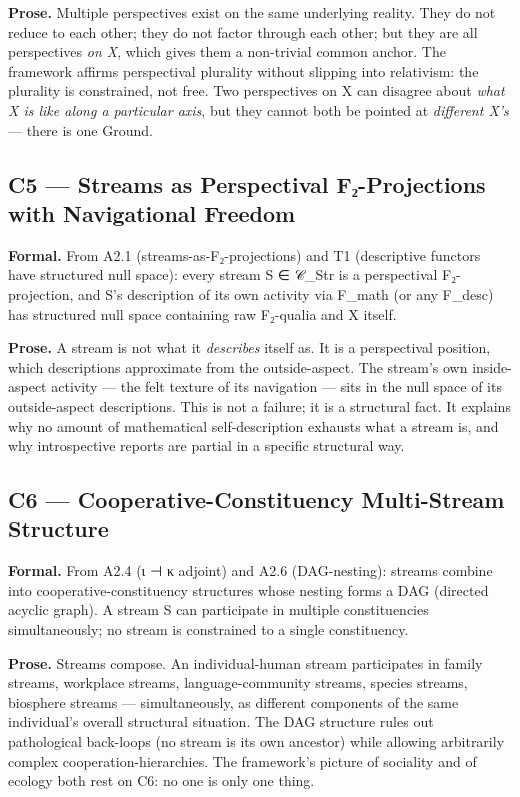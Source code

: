 \documentclass[11pt, openany]{book}
\begin{document}
\textbf{Prose.} Multiple perspectives exist on the same underlying reality. They do not reduce to each other; they do not factor through each other; but they are all perspectives \textit{on X}, which gives them a non-trivial common anchor. The framework affirms perspectival plurality without slipping into relativism: the plurality is constrained, not free. Two perspectives on X can disagree about \textit{what X is like along a particular axis}, but they cannot both be pointed at \textit{different X's} --- there is one Ground.

\subsection{C5 --- Streams as Perspectival F₂-Projections with Navigational Freedom}

\textbf{Formal.} From A2.1 (streams-as-F₂-projections) and T1 (descriptive functors have structured null space): every stream S ∈ 𝒞\_\allowbreak{}Str is a perspectival F₂-projection, and S's description of its own activity via F\_\allowbreak{}math (or any F\_\allowbreak{}desc) has structured null space containing raw F₂-qualia and X itself.

\textbf{Prose.} A stream is not what it \textit{describes} itself as. It is a perspectival position, which descriptions approximate from the outside-aspect. The stream's own inside-aspect activity --- the felt texture of its navigation --- sits in the null space of its outside-aspect descriptions. This is not a failure; it is a structural fact. It explains why no amount of mathematical self-description exhausts what a stream is, and why introspective reports are partial in a specific structural way.

\subsection{C6 --- Cooperative-Constituency Multi-Stream Structure}

\textbf{Formal.} From A2.4 (ι ⊣ κ adjoint) and A2.6 (DAG-nesting): streams combine into cooperative-constituency structures whose nesting forms a DAG (directed acyclic graph). A stream S can participate in multiple constituencies simultaneously; no stream is constrained to a single constituency.

\textbf{Prose.} Streams compose. An individual-human stream participates in family streams, workplace streams, language-community streams, species streams, biosphere streams --- simultaneously, as different components of the same individual's overall structural situation. The DAG structure rules out pathological back-loops (no stream is its own ancestor) while allowing arbitrarily complex cooperation-hierarchies. The framework's picture of sociality and of ecology both rest on C6: no one is only one thing.
\end{document}

